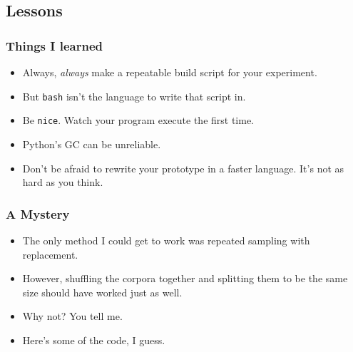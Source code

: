 \documentclass{beamer}
\begin{document}

\subsection{Lessons}
\begin{frame}
  \frametitle{Things I learned}
  \begin{itemize}
  \item Always, {\it always} make a repeatable build script for your experiment.
  \item But {\tt bash} isn't the language to write that script in. %
  \item Be {\tt nice}. Watch your program execute the first time.
  \item Python's GC can be unreliable.
  \item Don't be afraid to rewrite your prototype in a faster
    language. It's not as hard as you think.
  \end{itemize}
\end{frame}
\begin{frame}
  \frametitle{A Mystery}
  \begin{itemize}
  \item The only method I could get to work was repeated sampling with
    replacement.
  \item However, shuffling the corpora together and splitting them to
    be the same size should have worked just as well.
  \item Why not? You tell me.
  \item Here's some of the code, I guess.
  \end{itemize}
\end{frame}
\end{document}
